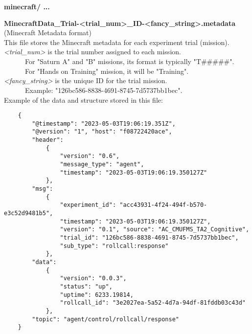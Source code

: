 \begin{description}
\item\textbf{minecraft/ ...}  %
\begin{addmargin}[0em]{0em} %
    \label{MinecraftData_Trial-<trial_num>_ID-<fancy_string>.metadata}
    \textbf{MinecraftData\_Trial-<trial\_num>\_ID-<fancy\_string>.metadata}\\(Minecraft Metadata format)\\
    This file stores the Minecraft metadata for each experiment trial (mission).\\
    \textit{<trial\_num>} is the trial number assigned to each mission.\\
    \verb|      |For "Saturn A" and "B" missions, its format is typically "T\#\#\#\#\#".\\
    \verb|      |For "Hands on Training" mission, it will be "Training".\\
    \textit{<fancy\_string>} is the unique ID for the trial mission.\\
    \verb|      |Example: "126bc586-8838-4691-8745-7d5737bb1bec".\\
    Example of the data and structure stored in this file:
    \begin{verbatim}
    {
        "@timestamp": "2023-05-03T19:06:19.351Z",
        "@version": "1", "host": "f08722420ace",
        "header":
            {
                "version": "0.6",
                "message_type": "agent",
                "timestamp": "2023-05-03T19:06:19.350127Z"
            },
        "msg":
            {
                "experiment_id": "acc43931-4f24-494f-b570-e3c52d9481b5",
                "timestamp": "2023-05-03T19:06:19.350127Z",
                "version": "0.1", "source": "AC_CMUFMS_TA2_Cognitive",
                "trial_id": "126bc586-8838-4691-8745-7d5737bb1bec",
                "sub_type": "rollcall:response"
            },
        "data":
            {
                "version": "0.0.3",
                "status": "up",
                "uptime": 6233.19814,
                "rollcall_id": "3e2027ea-5a52-4d7a-94df-81fddb03c43d"
            },
        "topic": "agent/control/rollcall/response"
    }
    \end{verbatim}

\end{addmargin}
\end{description}
